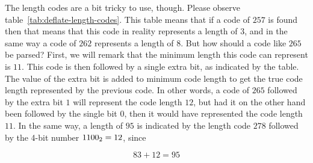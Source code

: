 The length codes are a bit tricky to use, though. Please observe
table~\ref{tab:deflate-length-codes}. This table means that if a code
of $257$ is found then that means that this code in reality represents
a length of $3$, and in the same way a code of $262$ represents a
length of $8$. But how should a code like $265$ be parsed? First, we
will remark that the minimum length this code can represent is
$11$. This code is then followed by a single extra bit, as indicated
by the table. The value of the extra bit is added to minimum code
length to get the true code length represented by the previous
code. In other words, a code of $265$ followed by the extra bit $1$
will represent the code length $12$, but had it on the other hand been
followed by the single bit $0$, then it would have represented the
code length $11$. In the same way, a length of $95$ is indicated by
the length code $278$ followed by the 4-bit number $\mbox{\ensuremath{1100_2}}=12$,
since

\begin{equation*}
  83 + 12 = 95
\end{equation*}

